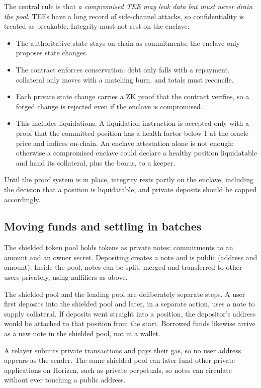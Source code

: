 \documentclass[11pt,a4paper]{article}
\begin{document}
The central rule is that \emph{a compromised TEE may leak data but must never drain the pool}. TEEs have a long
record of side-channel attacks, so confidentiality is treated as breakable. Integrity must not rest on the
enclave:
\begin{itemize}
  \item The authoritative state stays on-chain as commitments; the enclave only proposes state changes.
  \item The contract enforces conservation: debt only falls with a repayment, collateral only moves with a
        matching burn, and totals must reconcile.
  \item Each private state change carries a ZK proof that the contract verifies, so a forged change is rejected
        even if the enclave is compromised.
  \item This includes liquidations. A liquidation instruction is accepted only with a proof that the committed
        position has a health factor below 1 at the oracle price and indices on-chain. An enclave attestation
        alone is not enough: otherwise a compromised enclave could declare a healthy position liquidatable and
        hand its collateral, plus the bonus, to a keeper.
\end{itemize}
Until the proof system is in place, integrity rests partly on the enclave, including the decision that a position
is liquidatable, and private deposits should be capped accordingly.

\subsection{Moving funds and settling in batches}
\label{sec:batch}

The shielded token pool holds tokens as private notes: commitments to an amount and an owner secret. Depositing
creates a note and is public (address and amount). Inside the pool, notes can be split, merged and transferred to
other users privately, using nullifiers as above.

The shielded pool and the lending pool are deliberately separate steps. A user first deposits into the shielded
pool and later, in a separate action, uses a note to supply collateral. If deposits went straight into a
position, the depositor's address would be attached to that position from the start. Borrowed funds likewise
arrive as a new note in the shielded pool, not in a wallet.

A relayer submits private transactions and pays their gas, so no user address appears as the sender. The same
shielded pool can later fund other private applications on Horizen, such as private perpetuals, so notes can
circulate without ever touching a public address.
\end{document}
